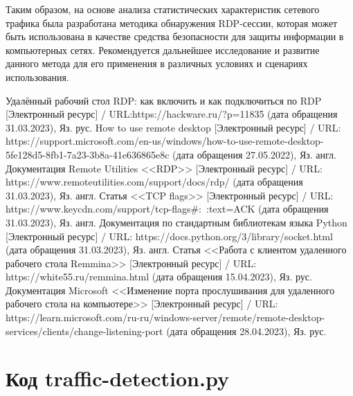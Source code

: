 \documentclass[bachelor, och, coursework]{SCWorks}
\begin{document}
Таким образом, на основе анализа статистических характеристик сетевого трафика была разработана методика обнаружения RDP-сессии, 
которая может быть использована в качестве средства безопасности для защиты информации в компьютерных сетях. 
Рекомендуется дальнейшее исследование и развитие данного метода для его применения в различных условиях и сценариях использования.

  \begin{thebibliography}{15}
    Удалённый рабочий стол RDP: как включить и как подключиться по RDP [Электронный ресурс] / URL:https://hackware.ru/?p=11835 (дата обращения 31.03.2023), Яз. рус.
    How to use remote desktop [Электронный ресурс] / URL: https://support.microsoft.com/en-us/windows/how-to-use-remote-desktop-5fe128d5-8fb1-7a23-3b8a-41e636865e8c (дата обращения 27.05.2022), Яз. англ.
    Документация Remote Utilities <<RDP>> [Электронный ресурс] / URL:  https://www.remoteutilities.com/support/docs/rdp/ (дата обращения 31.03.2023), Яз. англ.
    Статья <<TCP flags>> [Электронный ресурс] / URL: https://www.keycdn.com/support/tcp-flags\#:~:text=ACK
    (дата обращения 31.03.2023), Яз. англ.
    Документация по стандартным библиотекам языка Python [Электронный ресурс] / URL: https://docs.python.org/3/library/socket.html (дата обращения 31.03.2023), Яз. англ.
    Статья <<Работа с клиентом удаленного рабочего стола Remmina>> [Электронный ресурс] / URL: https://white55.ru/remmina.html
    (дата обращения 15.04.2023), Яз. рус.
    Документация Microsoft <<Изменение порта прослушивания для удаленного рабочего стола на компьютере>> [Электронный ресурс] / URL: https://learn.microsoft.com/ru-ru/windows-server/remote/remote-desktop-services/clients/change-listening-port
    (дата обращения 28.04.2023), Яз. рус.
  \end{thebibliography}

  \appendix

    \section{Код traffic-detection.py}
    \inputminted[fontsize=\footnotesize, linenos]{Python}{code/traffic-detection.py}
\end{document}
